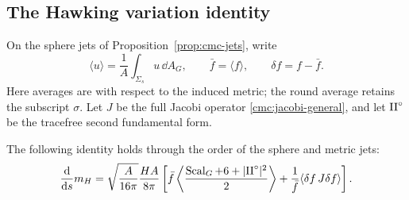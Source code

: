 \subsection{The Hawking variation identity}

On the sphere jets of Proposition~\ref{prop:cmc-jets}, write
\[
 \langle u\rangle=\frac1A\int_{\Sigma_s}u\,\dd A_G,
 \qquad \bar f=\langle f\rangle,\qquad \delta f=f-\bar f.
\]
Here averages are with respect to the induced metric; the round
average retains the subscript \(\sigma\).
Let \(J\) be the full Jacobi operator
\eqref{cmc:jacobi-general}, and let \(\mathrm{II}^\circ\) be the tracefree
second fundamental form.

\begin{lemma}\label{lem:hawking-variation}
The following identity holds through the order of the sphere and
metric jets:
\begin{equation}\label{cmc:hawking-variation}
 \frac{\mathrm{d}}{\mathrm{d} s}m_H
 =\sqrt{\frac A{16\pi}}\frac{HA}{8\pi}
 \left[
 \bar f\left\langle
      \frac{\operatorname{Scal}_G+6+|\mathrm{II}^\circ|^2}{2}
       \right\rangle
 +\frac1{\bar f}\langle\delta f\,J\delta f\rangle
 \right].
\end{equation}
\end{lemma}

